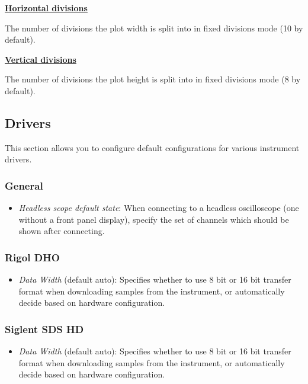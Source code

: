 \textbf{\underline{Horizontal divisions}}

The number of divisions the plot width is split into in fixed divisions mode (10 by default).

\textbf{\underline{Vertical divisions}}

The number of divisions the plot height is split into in fixed divisions mode (8 by default).


\subsection{Drivers}

This section allows you to configure default configurations for various instrument drivers.

\subsubsection{General}

\begin{itemize}
\item \emph{Headless scope default state}: When connecting to a headless oscilloscope (one without a front panel
display), specify the set of channels which should be shown after connecting.
\end{itemize}

\subsubsection{Rigol DHO}

\begin{itemize}
\item \emph{Data Width} (default auto): Specifies whether to use 8 bit or 16 bit transfer format when downloading samples
from the instrument, or automatically decide based on hardware configuration.
\end{itemize}

\subsubsection{Siglent SDS HD}

\begin{itemize}
\item \emph{Data Width} (default auto): Specifies whether to use 8 bit or 16 bit transfer format when downloading samples
from the instrument, or automatically decide based on hardware configuration.
\end{itemize}

